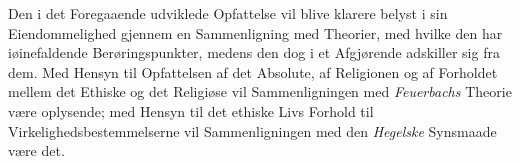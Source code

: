 Den i det Foregaaende udviklede Opfattelse vil blive klarere belyst i sin
Eiendommelighed gjennem en Sammenligning med Theorier, med hvilke den har
iøinefaldende Berøringspunkter, medens den dog i et Afgjørende adskiller sig
fra dem. Med Hensyn til Opfattelsen af det Absolute, af Religionen og af
Forholdet mellem det Ethiske og det Religiøse vil Sammenligningen med
\emph{Feuerbachs} Theorie være oplysende; med Hensyn til det ethiske Livs
Forhold til Virkelighedsbestemmelserne vil Sammenligningen med den
\emph{Hegelske} Synsmaade være det.

